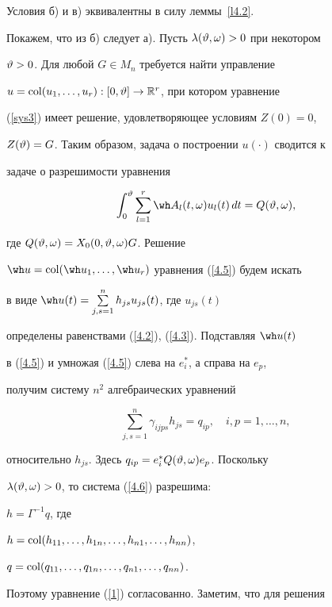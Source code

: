 \begin{pf} Условия б) и в) эквивалентны в силу леммы~\ref{l4.2}.


Покажем, что из б) следует а). Пусть $\lambda(\vartheta,\omega)>0$ при некотором


$\vartheta>0$. Для любой $G\in M_n$ требуется найти управление


$u=\operatorname{col}(u_1,\dotsc,u_r):[0,\vartheta]\to\Bbb R^r$, при котором уравнение


(\ref{sys3}) имеет решение, удовлетворяющее условиям $Z(0)=0$,


$Z(\vartheta)=G$. Таким образом, задача о построении $u(\cdot)$ сводится к


задаче о разрешимости уравнения


\begin{equation}


\label{4.5}


\int_0^{\vt}\sum_{l=1}^r\wh A_l(t,\omega)u_l(t)\,dt=Q(\vt,\omega),


\end{equation}


где $Q(\vartheta,\omega)=X_0(0,\vartheta,\omega)G$. Решение


$\wh u=\col(\wh u_1,\dotsc,\wh u_r)$ уравнения (\ref{4.5}) будем искать


в виде $\wh u(t)=\sum\limits_{j,s=1}^n h_{js}u_{js}(t)$, где $u_{js}(t)$


определены равенствами (\ref{4.2}), (\ref{4.3}). Подставляя $\wh u(t)$


в (\ref{4.5}) и умножая (\ref{4.5}) слева на $e_i^*$, а справа на $e_p$,


получим систему $n^2$ алгебраических уравнений


\begin{equation}


\label{4.6}


\sum_{j, s=1}^n\gamma_{ijps}h_{js}=q_{ip},\quad i,p=1,\dotsc,n,


\end{equation}


относительно $h_{js}$. Здесь $q_{ip}=e_i^*Q(\vartheta,\omega)e_p$. Поскольку


$\lambda(\vartheta,\omega)>0$, то система (\ref{4.6}) разрешима:


$h=\Gamma^{-1}q$, где


$h=\operatorname{col}(h_{11},\dotsc,h_{1n},\dotsc,h_{n1},\dotsc,h_{nn})$,


$q=\operatorname{col}(q_{11},\dotsc,q_{1n},\dotsc,q_{n1},\dotsc,q_{nn})$.


Поэтому уравнение (\ref{1}) согласованно. Заметим, что для решения



\end{pf}
